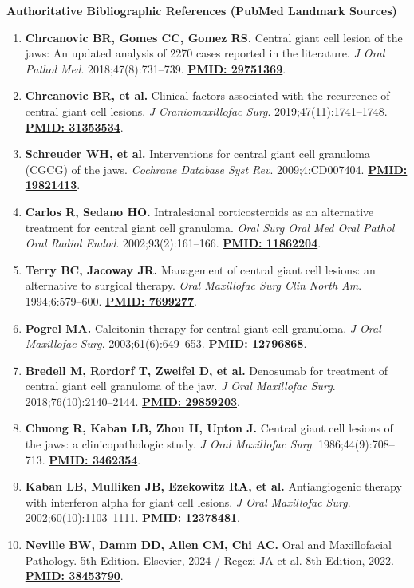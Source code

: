 \documentclass[9pt,a4paper]{article}
\begin{document}
\vspace{5pt}
{\large\bfseries Authoritative Bibliographic References (PubMed Landmark Sources)}
\vspace{2pt}

\small
\begin{enumerate}
    \item \textbf{Chrcanovic BR, Gomes CC, Gomez RS.} Central giant cell lesion of the jaws: An updated analysis of 2270 cases reported in the literature. \textit{J Oral Pathol Med}. 2018;47(8):731--739. \href{https://pubmed.ncbi.nlm.nih.gov/29751369/}{\textbf{PMID: 29751369}}.
    \item \textbf{Chrcanovic BR, et al.} Clinical factors associated with the recurrence of central giant cell lesions. \textit{J Craniomaxillofac Surg}. 2019;47(11):1741--1748. \href{https://pubmed.ncbi.nlm.nih.gov/31353534/}{\textbf{PMID: 31353534}}.
    \item \textbf{Schreuder WH, et al.} Interventions for central giant cell granuloma (CGCG) of the jaws. \textit{Cochrane Database Syst Rev}. 2009;4:CD007404. \href{https://pubmed.ncbi.nlm.nih.gov/19821413/}{\textbf{PMID: 19821413}}.
    \item \textbf{Carlos R, Sedano HO.} Intralesional corticosteroids as an alternative treatment for central giant cell granuloma. \textit{Oral Surg Oral Med Oral Pathol Oral Radiol Endod}. 2002;93(2):161--166. \href{https://pubmed.ncbi.nlm.nih.gov/11862204/}{\textbf{PMID: 11862204}}.
    \item \textbf{Terry BC, Jacoway JR.} Management of central giant cell lesions: an alternative to surgical therapy. \textit{Oral Maxillofac Surg Clin North Am}. 1994;6:579--600. \href{https://pubmed.ncbi.nlm.nih.gov/7699277/}{\textbf{PMID: 7699277}}.
    \item \textbf{Pogrel MA.} Calcitonin therapy for central giant cell granuloma. \textit{J Oral Maxillofac Surg}. 2003;61(6):649--653. \href{https://pubmed.ncbi.nlm.nih.gov/12796868/}{\textbf{PMID: 12796868}}.
    \item \textbf{Bredell M, Rordorf T, Zweifel D, et al.} Denosumab for treatment of central giant cell granuloma of the jaw. \textit{J Oral Maxillofac Surg}. 2018;76(10):2140--2144. \href{https://pubmed.ncbi.nlm.nih.gov/29859203/}{\textbf{PMID: 29859203}}.
    \item \textbf{Chuong R, Kaban LB, Zhou H, Upton J.} Central giant cell lesions of the jaws: a clinicopathologic study. \textit{J Oral Maxillofac Surg}. 1986;44(9):708--713. \href{https://pubmed.ncbi.nlm.nih.gov/3462354/}{\textbf{PMID: 3462354}}.
    \item \textbf{Kaban LB, Mulliken JB, Ezekowitz RA, et al.} Antiangiogenic therapy with interferon alpha for giant cell lesions. \textit{J Oral Maxillofac Surg}. 2002;60(10):1103--1111. \href{https://pubmed.ncbi.nlm.nih.gov/12378481/}{\textbf{PMID: 12378481}}.
    \item \textbf{Neville BW, Damm DD, Allen CM, Chi AC.} Oral and Maxillofacial Pathology. 5th Edition. Elsevier, 2024 / Regezi JA et al. 8th Edition, 2022. \href{https://pubmed.ncbi.nlm.nih.gov/38453790/}{\textbf{PMID: 38453790}}.
\end{enumerate}
\end{document}
